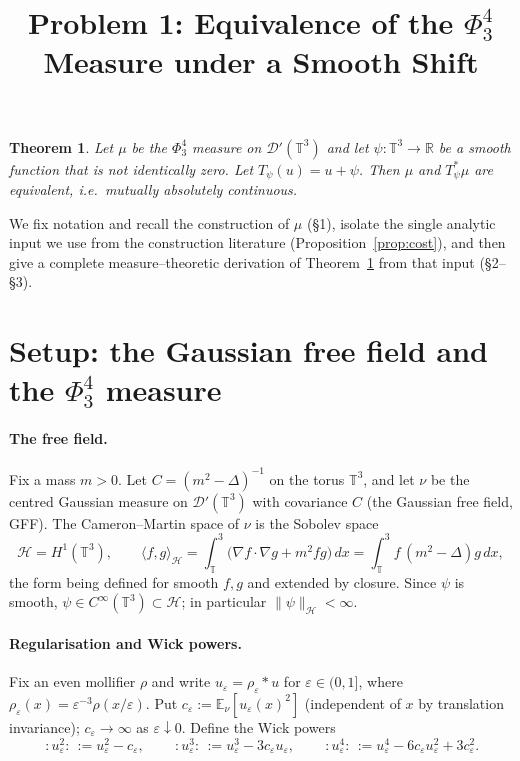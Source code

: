 \documentclass[12pt]{article}
\title{Problem 1: Equivalence of the $\Phi^4_3$ Measure under a Smooth Shift}
\date{}
\newtheorem{theorem}{Theorem}
\theoremstyle{definition}
\newcommand{\T}{\mathbb{T}^3}
\newcommand{\R}{\mathbb{R}}
\newcommand{\E}{\mathbb{E}}
\newcommand{\D}{\mathcal{D}'(\T)}
\newcommand{\Wick}[1]{\,{:}#1{:}\,}
\begin{document}
\maketitle

\begin{theorem}\label{thm:main}
Let $\mu$ be the $\Phi^4_3$ measure on $\D$ and let $\psi\colon\T\to\R$ be a smooth
function that is not identically zero. Let $T_\psi(u)=u+\psi$. Then $\mu$ and
$T_\psi^{*}\mu$ are equivalent, i.e.\ mutually absolutely continuous.
\end{theorem}

We fix notation and recall the construction of $\mu$ (\S1), isolate the single analytic
input we use from the construction literature (Proposition~\ref{prop:cost}), and then
give a complete measure--theoretic derivation of Theorem~\ref{thm:main} from that input
(\S2--\S3).

\section{Setup: the Gaussian free field and the $\Phi^4_3$ measure}

\paragraph{The free field.}
Fix a mass $m>0$. Let $C=(m^2-\Delta)^{-1}$ on the torus $\T$, and let $\nu$ be the
centred Gaussian measure on $\D$ with covariance $C$ (the Gaussian free field, GFF). The
Cameron--Martin space of $\nu$ is the Sobolev space
\begin{equation}\label{eq:CM-space}
  \mathcal{H}=H^1(\T),\qquad
  \langle f,g\rangle_{\mathcal H}=\int_\T\big(\nabla f\cdot\nabla g+m^2 fg\big)\,dx
  =\int_\T f\,(m^2-\Delta)g\,dx ,
\end{equation}
the form being defined for smooth $f,g$ and extended by closure. Since $\psi$ is smooth,
$\psi\in C^\infty(\T)\subset\mathcal H$; in particular $\|\psi\|_{\mathcal H}<\infty$.

\paragraph{Regularisation and Wick powers.}
Fix an even mollifier $\rho$ and write $u_\varepsilon=\rho_\varepsilon*u$ for
$\varepsilon\in(0,1]$, where $\rho_\varepsilon(x)=\varepsilon^{-3}\rho(x/\varepsilon)$.
Put $c_\varepsilon:=\E_\nu[u_\varepsilon(x)^2]$ (independent of $x$ by translation
invariance); $c_\varepsilon\to\infty$ as $\varepsilon\downarrow0$. Define the Wick powers
\begin{equation}\label{eq:wick}
  \Wick{u_\varepsilon^2}:=u_\varepsilon^2-c_\varepsilon,\qquad
  \Wick{u_\varepsilon^3}:=u_\varepsilon^3-3c_\varepsilon u_\varepsilon,\qquad
  \Wick{u_\varepsilon^4}:=u_\varepsilon^4-6c_\varepsilon u_\varepsilon^2+3c_\varepsilon^2 .
\end{equation}
\end{document}
